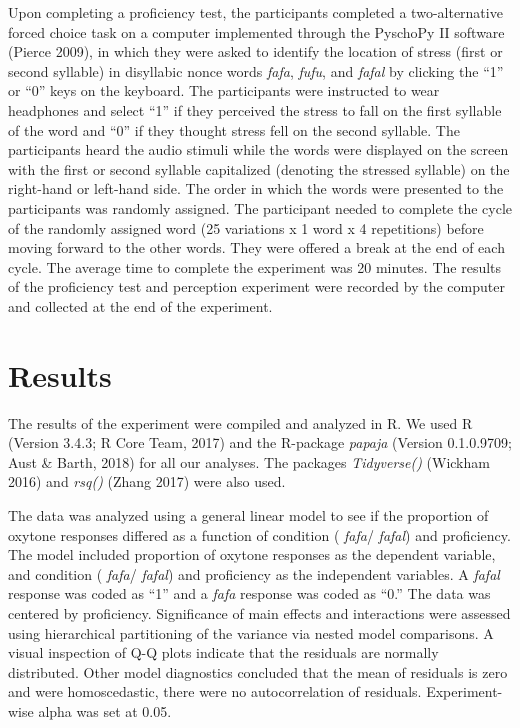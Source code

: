 \documentclass[man]{apa6}
\theoremstyle{definition}
\theoremstyle{definition}
\theoremstyle{definition}
\theoremstyle{remark}
\begin{document}
Upon completing a proficiency test, the participants completed a
two-alternative forced choice task on a computer implemented through the
PyschoPy II software (Pierce 2009), in which they were asked to identify
the location of stress (first or second syllable) in disyllabic nonce
words \emph{fafa}, \emph{fufu}, and \emph{fafal} by clicking the
\enquote{1} or \enquote{0} keys on the keyboard. The participants were
instructed to wear headphones and select \enquote{1} if they perceived
the stress to fall on the first syllable of the word and \enquote{0} if
they thought stress fell on the second syllable. The participants heard
the audio stimuli while the words were displayed on the screen with the
first or second syllable capitalized (denoting the stressed syllable) on
the right-hand or left-hand side. The order in which the words were
presented to the participants was randomly assigned. The participant
needed to complete the cycle of the randomly assigned word (25
variations x 1 word x 4 repetitions) before moving forward to the other
words. They were offered a break at the end of each cycle. The average
time to complete the experiment was 20 minutes. The results of the
proficiency test and perception experiment were recorded by the computer
and collected at the end of the experiment.

\section{Results}\label{results}

The results of the experiment were compiled and analyzed in R. We used R
(Version 3.4.3; R Core Team, 2017) and the R-package \emph{papaja}
(Version 0.1.0.9709; Aust \& Barth, 2018) for all our analyses. The
packages \emph{Tidyverse()} (Wickham 2016) and \emph{rsq()} (Zhang 2017)
were also used.

The data was analyzed using a general linear model to see if the
proportion of oxytone responses differed as a function of condition (
\emph{fafa}/ \emph{fafal}) and proficiency. The model included
proportion of oxytone responses as the dependent variable, and condition
( \emph{fafa}/ \emph{fafal}) and proficiency as the independent
variables. A \emph{fafal} response was coded as \enquote{1} and a
\emph{fafa} response was coded as \enquote{0.} The data was centered by
proficiency. Significance of main effects and interactions were assessed
using hierarchical partitioning of the variance via nested model
comparisons. A visual inspection of Q-Q plots indicate that the
residuals are normally distributed. Other model diagnostics concluded
that the mean of residuals is zero and were homoscedastic, there were no
autocorrelation of residuals. Experiment-wise alpha was set at 0.05.
\end{document}
